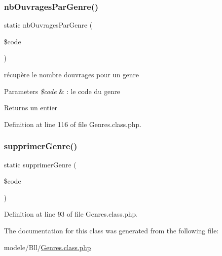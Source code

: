 \subsubsection{\texorpdfstring{nb\+Ouvrages\+Par\+Genre()}{nbOuvragesParGenre()}}
{\footnotesize\ttfamily static nb\+Ouvrages\+Par\+Genre (\begin{DoxyParamCaption}\item[{}]{\$code }\end{DoxyParamCaption})\hspace{0.3cm}{\ttfamily [static]}}

récupère le nombre d\textquotesingle{}ouvrages pour un genre 
\begin{DoxyParams}{Parameters}
{\em \$code} & \+: le code du genre \\
\hline
\end{DoxyParams}
\begin{DoxyReturn}{Returns}
un entier 
\end{DoxyReturn}


Definition at line 116 of file Genres.\+class.\+php.

\mbox{\label{class_genres_a62be7460d8b307efca163e2b5ca79da3}} 
\subsubsection{\texorpdfstring{supprimer\+Genre()}{supprimerGenre()}}
{\footnotesize\ttfamily static supprimer\+Genre (\begin{DoxyParamCaption}\item[{}]{\$code }\end{DoxyParamCaption})\hspace{0.3cm}{\ttfamily [static]}}



Definition at line 93 of file Genres.\+class.\+php.



The documentation for this class was generated from the following file\+:\begin{DoxyCompactItemize}
\item 
modele/\+Bll/\hyperlink{_genres_8class_8php}{Genres.\+class.\+php}\end{DoxyCompactItemize}
